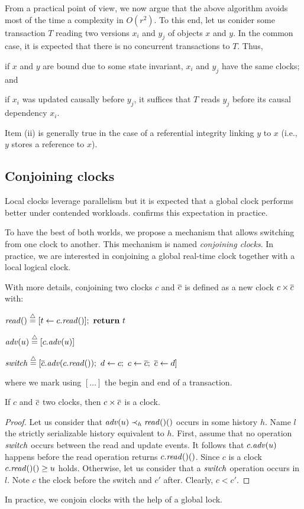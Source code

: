 From a practical point of view, we now argue that the above algorithm avoids most of the time a complexity in $O(r^2)$.
To this end, let us conider some transaction $T$ reading two versions $x_i$ and $y_j$ of objects $x$ and $y$.
In the common case, it is expected that there is no concurrent transactions to $T$.
Thus,
\begin{inparaenum}
\item if $x$ and $y$ are bound due to some state invariant, $x_i$ and $y_j$ have the same clocks; and
\item if $x_i$ was updated causally before $y_j$, it suffices that $T$ reads $y_j$ before its causal dependency $x_i$.
\end{inparaenum}
Item (ii) is generally true in the case of a referential integrity linking $y$ to $x$ (i.e., $y$ stores a reference to $x$).

\subsection{Conjoining clocks}

Local clocks leverage parallelism but it is expected that a global clock performs better under contended workloads.
 confirms this expectation in practice.

To have the best of both worlds, we propose a mechanism that allows switching from one clock to another.
This mechanism is named \emph{conjoining clocks}.
In practice, we are interested in conjoining a global real-time clock together with a local logical clock.

With more details, conjoining two clocks $c$ and $\barc$ is defined as a new clock $c \times \barc$ with:
\begin{compactitem}
\item $\cread \equaldef [t \assign c.\cread];~\text{\textbf{return}}~t$
\item $\cadv(u) \equaldef [c.\cadv(u)]$
\item $\cswitch \equaldef [\barc.\cadv(c.\cread);~d \assign c;~c \assign \barc;~\barc \assign d]$
\end{compactitem}
where we mark using $[ \ldots ]$ the begin and end of a transaction.

\begin{proposition}
  If $c$ and $\barc$ two clocks, then $c \times \barc$ is a clock.
\end{proposition}

\begin{proof}  
  Let us consider that $\cadv(u) \hb_h \cread()$ occurs in some history $h$.
  Name $l$ the strictly serializable history equivalent to $h$.
  First, assume that no operation $\cswitch$ occurs between the read and update events.
  It follows that $c.\cadv(u)$ happens before the read operation returns $c.\cread()$.
  Since $c$ is a clock $c.\cread() \geq u$ holds.
  Otherwise, let us consider that a $\cswitch$ operation occurs in $l$.
  Note $c$ the clock before the switch and $c'$ after.
  Clearly, $c < c'$.
  
\end{proof}

In practice, we conjoin clocks with the help of a global lock.

